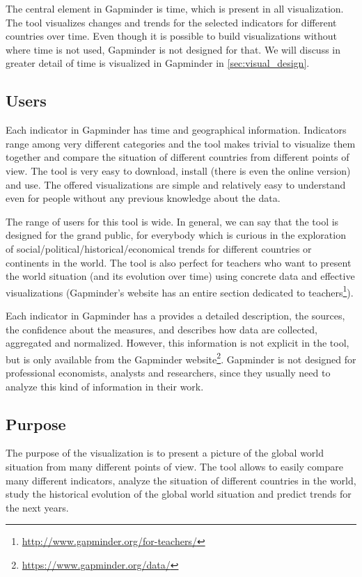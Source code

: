 \vspace{3mm}

The central element in Gapminder is time, which is present in all visualization.
The tool visualizes changes and trends for the selected indicators for different countries over time.
Even though it is possible to build visualizations without where time is not used, Gapminder is not designed for that.
We will discuss in greater detail of time is visualized in Gapminder in \cref{sec:visual_design}.


\subsection{Users}
Each indicator in Gapminder has time and geographical information.
Indicators range among very different categories and the tool makes trivial to visualize them together and compare the situation of different countries from different points of view.
The tool is very easy to download, install (there is even the online version) and use.
The offered visualizations are simple and relatively easy to understand even for people without any previous knowledge about the data.

The range of users for this tool is wide.
In general, we can say that the tool is designed for the grand public, for everybody which is curious in the exploration of social/political/historical/economical trends for different countries or continents in the world.
The tool is also perfect for teachers who want to present the world situation (and its evolution over time) using concrete data and effective visualizations 
(Gapminder's website has an entire section dedicated to teachers\footnote{\url{http://www.gapminder.org/for-teachers/}}).

Each indicator in Gapminder has a provides a detailed description, the sources, the confidence about the measures, and describes how data are collected, aggregated and normalized.
However, this information is not explicit in the tool, but is only available from the Gapminder website\footnote{\url{https://www.gapminder.org/data/}}.
Gapminder is not designed for professional economists, analysts and researchers, since they usually need to analyze this kind of information in their work.


\subsection{Purpose}
The purpose of the visualization is to present a picture of the global world situation from many different points of view.
The tool allows to easily compare many different indicators, analyze the situation of different countries in the world, study the historical evolution of the global world situation and predict trends for the next years.

